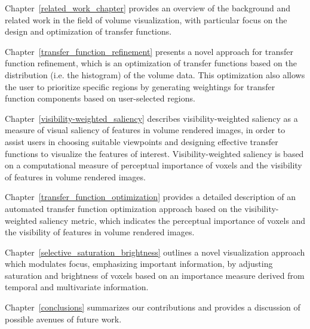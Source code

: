 Chapter~\ref{related_work_chapter}
provides an overview of the background and related work in the field of volume visualization, with particular focus on the design and optimization of transfer functions.

Chapter~\ref{transfer_function_refinement}
presents a novel approach for transfer function refinement, which is an optimization of transfer functions based on the distribution (i.e. the histogram) of the volume data. This optimization also allows the user to prioritize specific regions by generating weightings for transfer function components based on user-selected regions.

Chapter~\ref{visibility-weighted_saliency}
describes visibility-weighted saliency as a measure of visual saliency of features in volume rendered images, in order to assist users in choosing suitable viewpoints and designing effective transfer functions to visualize the features of interest. Visibility-weighted saliency is based on a computational measure of perceptual importance of voxels and the visibility of features in volume rendered images.

Chapter~\ref{transfer_function_optimization}
provides a detailed description of an automated transfer function optimization approach based on the visibility-weighted saliency metric, which indicates the perceptual importance of voxels and the visibility of features in volume rendered images.

Chapter~\ref{selective_saturation_brightness}
outlines a novel visualization approach which modulates focus, emphasizing important information, by adjusting saturation and brightness of voxels based on an importance measure derived from temporal and multivariate information.

Chapter~\ref{conclusions}
summarizes our contributions and provides a discussion of possible avenues of future work.

%
%

